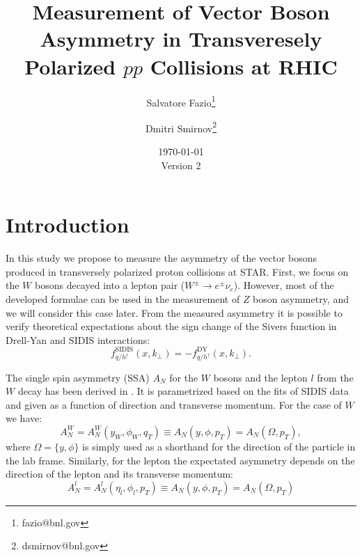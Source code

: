 \documentclass[12pt]{article}
\begin{document}
\setcounter{section}{0}
\setcounter{subsection}{0}
\setcounter{equation}{0}
\setcounter{figure}{0}
\setcounter{footnote}{0}
\setcounter{table}{0}


\title{Measurement of Vector Boson Asymmetry in Transveresely Polarized $pp$
Collisions at RHIC}

\author{Salvatore Fazio\thanks{fazio@bnl.gov}}
\author{Dmitri Smirnov\thanks{dsmirnov@bnl.gov}}


\date{\today\\[1em]Version 2}

\maketitle

\newpage

\tableofcontents 

\newpage

\section{Introduction}

In this study we propose to measure the asymmetry of the vector bosons produced
in transversely polarized proton collisions at STAR. First, we focus on the $W$
bosons decayed into a lepton pair ($W^\pm \to e^\pm \nu_e$). However, most of the
developed formulae can be used in the measurement of $Z$ boson asymmetry, and
we will consider this case later. From the measured asymmetry it is possible to
verify theoretical expectations about the sign change of the Sivers function in
Drell-Yan and SIDIS interactions:
%
\begin{equation}
f^\text{SIDIS}_{q/h^\uparrow} (x, k_\perp) = - f^\text{DY}_{q/h^\uparrow} (x, k_\perp).
\end{equation}

The single spin asymmetry (SSA) $A_N$ for the $W$ bosons and the lepton $l$
from the $W$ decay has been derived in \cite{Kang:2009bp, zpaper}. It is
parametrized based on the fits of SIDIS data and given as a function of
direction and transverse momentum. For the case of $W$ we have:
%
\begin{equation}
A^W_N = A^W_N(y_W, \phi_W, q_T) \equiv A_N(y, \phi, p_T) = A_N(\Omega, p_T),
\label{eq:asym_wboson}
\end{equation}
%
where $\Omega = \{y, \phi\}$ is simply used as a shorthand for the direction of
the particle in the lab frame. Similarly, for the lepton the expectated
asymmetry depends on the direction of the lepton and its transverse momentum:
%
\begin{equation}
A^l_N = A^l_N(\eta_l, \phi_l, p_T) \equiv A_N(y, \phi, p_T) = A_N(\Omega, p_T)
\label{eq:asym_lepton}
\end{equation}
\end{document}
